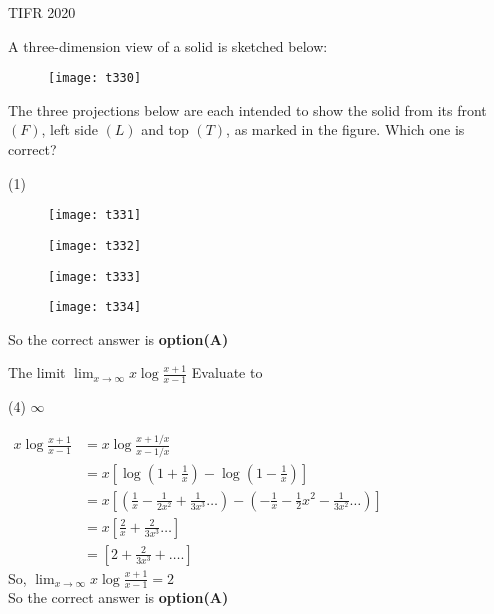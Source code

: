 \begin{abox}
TIFR 2020
\end{abox}
\begin{questions}
\begin{minipage}{\textwidth}
	\question A three-dimension view of a solid is sketched below:\\
	\begin{figure}[H]
		\centering
		\texttt{[image: t330]}
	\end{figure}
	The three projections below are each intended to show the solid from its front $(F)$, left side $(L)$ and top $(T)$, as marked in the figure. Which one is correct?
\end{minipage}
\begin{tasks}(1)
	\task[\textbf{A.}] \begin{figure}[H]
		\centering
		\texttt{[image: t331]}
	\end{figure}
	\task[\textbf{B.}] \begin{figure}[H]
		\centering
		\texttt{[image: t332]}
	\end{figure}
	\task[\textbf{C.}] \begin{figure}[H]
		\centering
		\texttt{[image: t333]}
	\end{figure}
	\task[\textbf{D.}] \begin{figure}[H]
		\centering
		\texttt{[image: t334]}
	\end{figure}
\end{tasks}
\begin{answer}
	So the correct answer is \textbf{option(A)}
\end{answer}
\begin{minipage}{\textwidth}
	\question The limit $\lim _{x \rightarrow \infty} x \log \frac{x+1}{x-1}$
	Evaluate to
\end{minipage}
\begin{tasks}(4)
	\task[\textbf{C.}] $\infty$
\end{tasks}
\begin{answer}
	$\begin{aligned} x \log \frac{x+1}{x-1} &=x \log \frac{x+1 / x}{x-1 / x} \\ &=x\left[\log \left(1+\frac{1}{x}\right)-\log \left(1-\frac{1}{x}\right)\right] \\ &=x\left[\left(\frac{1}{x}-\frac{1}{2 x^{2}}+\frac{1}{3 x^{3}} \ldots\right)-\left(-\frac{1}{x}-\frac{1}{2} x^{2}-\frac{1}{3 x^{2}} \ldots\right)\right] \\ &=x\left[\frac{2}{x}+\frac{2}{3 x^{3}} \ldots\right] \\ &=\left[2+\frac{2}{3 x^{3}}+\ldots .\right] \end{aligned}$\\
	So, $\lim _{x \rightarrow \infty} x \log \frac{x+1}{x-1}=2$\\
	So the correct answer is \textbf{option(A)}
	

\end{answer}
\end{questions}
